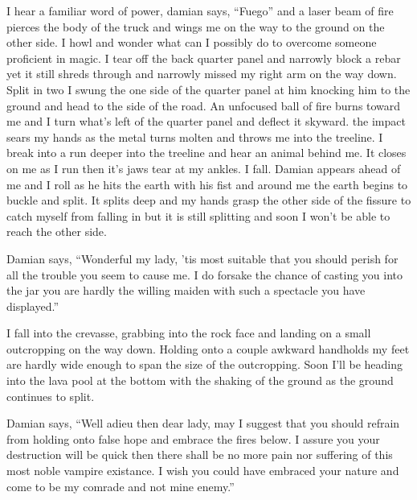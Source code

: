 I hear a familiar word of power, damian says, ``Fuego'' and a laser beam of fire pierces the body of the truck and wings me on the way to the ground on the other side. I howl and wonder what can I possibly do to overcome someone proficient in magic. I tear off the back quarter panel and narrowly block a rebar yet it still shreds through and narrowly missed my right arm on the way down. Split in two I swung the one side of the quarter panel at him knocking him to the ground and head to the side of the road. An unfocused ball of fire burns toward me and I turn what's left of the quarter panel and deflect it skyward. the impact sears my hands as the metal turns molten and throws me into the treeline. I break into a run deeper into the treeline and hear an animal behind me. It closes on me as I run then it's jaws tear at my ankles. I fall. Damian appears ahead of me and I roll as he hits the earth with his fist and around me the earth begins to buckle and split. It splits deep and my hands grasp the other side of the fissure to catch myself from falling in but it is still splitting and soon I won't be able to reach the other side.

Damian says, ``Wonderful my lady, 'tis most suitable that you should perish for all the trouble you seem to cause me. I do forsake the chance of casting you into the jar you are hardly the willing maiden with such a spectacle you have displayed.''

I fall into the crevasse, grabbing into the rock face and landing on a small outcropping on the way down. Holding onto a couple awkward handholds my feet are hardly wide enough to span the size of the outcropping. Soon I'll be heading into the lava pool at the bottom with the shaking of the ground as the ground continues to split.

Damian says, ``Well adieu then dear lady, may I suggest that you should refrain from holding onto false hope and embrace the fires below. I assure you your destruction will be quick then there shall be no more pain nor suffering of this most noble vampire existance. I wish you could have embraced your nature and come to be my comrade and not mine enemy.''

